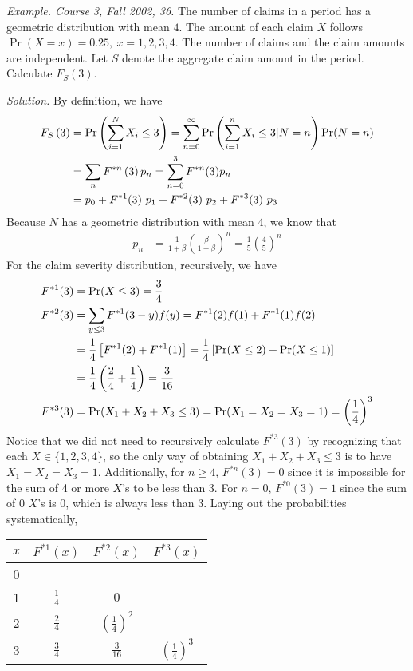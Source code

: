 \documentclass[12pt,letterpaper]{article}
\begin{document}
\noindent \textit{Example. Course 3, Fall 2002, 36.} The number of claims in a period has a geometric distribution with mean $4$. The amount of each claim $X$ follows $\Pr(X=x) = 0.25, \ x=1,2,3,4.$ The number of claims and the claim amounts are independent. Let $S$ denote the aggregate claim amount in the period. Calculate $F_{S}(3)$.

\bigskip

\noindent \textit{Solution.} By definition, we have
\begin{align*}
F_{S}\left(3 \right) &= {\rm Pr}\left(\sum_{i=1}^N X_i \leq 3\right) = \sum_{n=0}^\infty {\rm Pr}\left(\sum_{i=1}^n X_i\leq 3|N=n\right){\rm Pr}(N=n) \\
&= \sum_n F^{\ast n} \left(3 \right) p_n = \sum_{n=0}^3 F^{\ast n}(3) p_n \\
&= p_0 + F^{\ast 1}(3) \ p_1 + F^{\ast 2}(3) \ p_2 + F^{\ast 3}(3) \ p_3
\end{align*}
Because $N$ has a geometric distribution with mean 4, we know that
\begin{align*}
p_n &= \frac{1}{1+\beta}
\left(\frac{\beta}{1+ \beta} \right)^n = \frac{1}{5} \left(\frac{4}{5} \right)^n
\end{align*}
For the claim severity distribution, recursively, we have
\begin{align*}
F^{\ast 1}(3) &= \Pr(X \le 3) = \frac{3}{4} \\
F^{\ast 2}(3) &= \sum_{y \le 3} F^{\ast 1} (3-y) f(y) = F^{\ast 1}(2)f(1) + F^{\ast 1}(1)f(2) \\
&= \frac{1}{4}\left[F^{\ast 1} (2) + F^{\ast 1}(1)\right] = \frac{1}{4}\left[{\rm Pr}(X\leq 2) + {\rm Pr}(X \leq 1) \right] \\
&= \frac{1}{4} \left(\frac{2}{4} + \frac{1}{4} \right) = \frac{3}{16}\\
F^{\ast 3}(3) &= \Pr(X_1+X_2 + X_3 \le 3) = \Pr(X_1=X_2=X_3=1) = \left(\frac{1}{4} \right)^3
\end{align*}
Notice that we did not need to recursively calculate $F^{\ast 3}(3)$ by recognizing that each $X \in \{1,2,3,4\}$, so the only way of obtaining $X_1+X_2+X_3 \leq 3$ is to have $X_1=X_2=X_3=1$. Additionally, for $n \geq 4$, $F^{\ast n} (3)=0$ since it is impossible for the sum of 4 or more $X$'s to be less than 3. For $n=0$, $F^{\ast 0}(3) = 1$ since the sum of 0 $X$'s is 0, which is always less than 3. Laying out the probabilities systematically,

\begin {center}
\begin{tabular}{c c c c}\hline
	$x$ & $F^{\ast 1}(x)$ & $F^{\ast 2}(x)$ & $F^{\ast 3}(x)$\\ \hline
	0 & & & \\
	1 & $\frac{1}{4}$ & $0$ & \\
	2 & $\frac{2}{4}$ & $\left( \frac{1}{4} \right)^2$ & \\
	3 & $\frac{3}{4}$ & $\frac{3}{16}$ & $\left( \frac{1}{4} \right)^3$ \\ \hline
\end{tabular}
\end{center}
\end{document}
